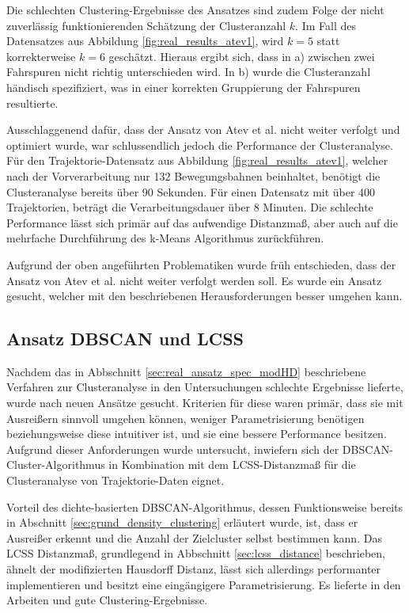 Die schlechten Clustering-Ergebnisse des Ansatzes sind zudem Folge der nicht zuverlässig funktionierenden Schätzung
der Clusteranzahl $k$. Im Fall des Datensatzes aus Abbildung \ref{fig:real_results_atev1}, wird $k = 5$
statt korrekterweise $k = 6$ geschätzt. Hieraus ergibt sich, dass in a) zwischen zwei Fahrspuren nicht richtig unterschieden wird.
In b) wurde die Clusteranzahl händisch spezifiziert, was in einer korrekten Gruppierung der Fahrspuren resultierte.

Ausschlaggenend dafür, dass der Ansatz von Atev et al. nicht weiter verfolgt und optimiert wurde, war schlussendlich
jedoch die Performance der Clusteranalyse. Für den Trajektorie-Datensatz aus Abbildung \ref{fig:real_results_atev1},
welcher nach der Vorverarbeitung nur 132 Bewegungsbahnen beinhaltet, benötigt die Clusteranalyse bereits über
90 Sekunden. Für einen Datensatz mit über 400 Trajektorien, beträgt die Verarbeitungsdauer über 8 Minuten.
Die schlechte Performance lässt sich primär auf das aufwendige Distanzmaß, aber auch auf die mehrfache
Durchführung des k-Means Algorithmus zurückführen.

Aufgrund der oben angeführten Problematiken wurde früh entschieden, dass der Ansatz von Atev et al. nicht weiter
verfolgt werden soll. Es wurde ein Ansatz gesucht, welcher mit den beschriebenen Herausforderungen besser
umgehen kann.

\subsection{Ansatz DBSCAN und LCSS}
\label{sec:real_ansatz_dbscan_lcss}

Nachdem das in Abbschnitt \ref{sec:real_ansatz_spec_modHD} beschriebene Verfahren zur Clusteranalyse in
den Untersuchungen schlechte Ergebnisse lieferte, wurde nach neuen Ansätze gesucht.
Kriterien für diese waren primär, dass sie mit Ausreißern sinnvoll umgehen können, weniger Parametrisierung
benötigen beziehungsweise diese intuitiver ist, und sie eine bessere Performance besitzen.
Aufgrund dieser Anforderungen wurde untersucht, inwiefern sich der DBSCAN-Cluster-Algorithmus
in Kombination mit dem LCSS-Distanzmaß für die Clusteranalyse von Trajektorie-Daten eignet.

Vorteil des dichte-basierten DBSCAN-Algorithmus, dessen Funktionsweise bereits in Abschnitt
\ref{sec:grund_density_clustering} erläutert wurde, ist, dass er Ausreißer erkennt und die Anzahl der
Zielcluster selbst bestimmen kann. Das LCSS Distanzmaß, grundlegend in Abbschnitt \ref{sec:lcss_distance}
beschrieben, ähnelt der modifizierten Hausdorff Distanz, lässt sich allerdings performanter implementieren
und besitzt eine eingängigere Parametrisierung. Es lieferte in den Arbeiten \cite[]{Morris2011} und
\cite[]{Chen2014} gute Clustering-Ergebnisse.


